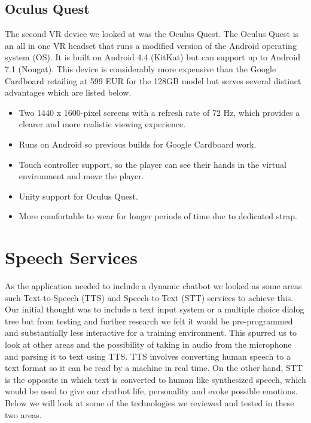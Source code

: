 \subsection{Oculus Quest}
The second VR device we looked at was the Oculus Quest. The Oculus Quest is an all in one VR headset that runs a modified version of the Android operating system (OS). It is built on Android 4.4 (KitKat) but can support up to Android 7.1 (Nougat). This device is considerably more expensive than the Google Cardboard retailing at 599 EUR for the 128GB model but serves several distinct advantages which are listed below.

\begin{itemize}
    \item Two 1440 x 1600-pixel screens with a refresh rate of 72 Hz, which provides a clearer and more realistic viewing experience.
    \item Runs on Android so previous builds for Google Cardboard work.
    \item Touch controller support, so the player can see their hands in the virtual environment and move the player.
    \item Unity support for Oculus Quest.
    \item More comfortable to wear for longer periods of time due to dedicated strap.
\end{itemize}

\section{Speech Services}
As the application needed to include a dynamic chatbot we looked as some areas such Text-to-Speech (TTS) and Speech-to-Text (STT) services to achieve this. Our initial thought was to include a text input system or a multiple choice dialog tree but from testing and further research we felt it would be pre-programmed and substantially less interactive for a training environment. This spurred us to look at other areas and the possibility of taking in audio from the microphone and parsing it to text using TTS. TTS involves converting human speech to a text format so it can be read by a machine in real time. On the other hand, STT is the opposite in which text is converted to human like synthesized speech, which would be used to give our chatbot life, personality and evoke possible emotions. Below we will look at some of the technologies we reviewed and tested in these two areas.

